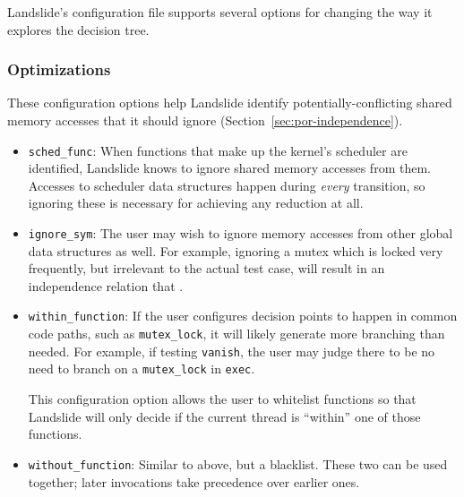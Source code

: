 Landslide's configuration file supports several options for changing the way it explores the decision tree.

\subsubsection{Optimizations}

These configuration options help Landslide identify potentially-conflicting shared memory accesses that it should ignore (Section~\ref{sec:por-independence}).

\begin{itemize}
	\small
	\item \texttt{sched\_func}: When functions that make up the kernel's scheduler are identified, Landslide knows to ignore shared memory accesses from them. Accesses to scheduler data structures happen during {\em every} transition, so ignoring these is necessary for achieving any reduction at all.
	\item \texttt{ignore\_sym}: The user may wish to ignore memory accesses from other global data structures as well. For example, ignoring a mutex which is locked very frequently, but irrelevant to the actual test case, will result in an independence relation that .
\end{itemize}


\begin{itemize}
	\item \texttt{within\_function}: If the user configures decision points to happen in common code paths, such as \texttt{mutex\_lock}, it will likely generate more branching than needed. For example, if testing \texttt{vanish}, the user may judge there to be no need to branch on a \texttt{mutex\_lock} in \texttt{exec}.

This configuration option allows the user to whitelist functions so that Landslide will only decide if the current thread is ``within'' one of those functions.
	\item \texttt{without\_function}: Similar to above, but a blacklist. These two can be used together; later invocations take precedence over earlier ones.
\end{itemize}


